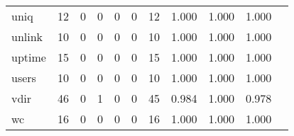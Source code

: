 \begin{longtable}{lp{1.20cm}p{1.20cm}p{1.20cm}p{1.20cm}p{1.20cm}p{1.20cm}p{1.20cm}p{1.20cm}p{1.20cm}p{1.20cm}}
uniq      &                                    12 &                                                  0 &                                                  0 &                                                  0 &                                                  0 &                                                 12 &                                         1.000 &                                              1.000 &                                              1.000 \\
unlink    &                                    10 &                                                  0 &                                                  0 &                                                  0 &                                                  0 &                                                 10 &                                         1.000 &                                              1.000 &                                              1.000 \\
uptime    &                                    15 &                                                  0 &                                                  0 &                                                  0 &                                                  0 &                                                 15 &                                         1.000 &                                              1.000 &                                              1.000 \\
users     &                                    10 &                                                  0 &                                                  0 &                                                  0 &                                                  0 &                                                 10 &                                         1.000 &                                              1.000 &                                              1.000 \\
vdir      &                                    46 &                                                  0 &                                                  1 &                                                  0 &                                                  0 &                                                 45 &                                         0.984 &                                              1.000 &                                              0.978 \\
wc        &                                    16 &                                                  0 &                                                  0 &                                                  0 &                                                  0 &                                                 16 &                                         1.000 &                                              1.000 &                                              1.000 \\

\end{longtable}

